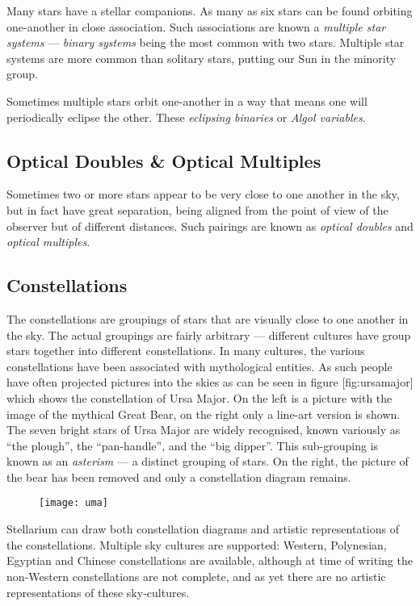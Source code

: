 Many stars have a stellar companions. As many as six stars can be found
orbiting one-another in close association. Such associations are known a
\emph{multiple star systems} --- \emph{binary systems} being the most
common with two stars. Multiple star systems are more common than
solitary stars, putting our Sun in the minority group.

Sometimes multiple stars orbit one-another in a way that means one will
periodically eclipse the other. These \emph{eclipsing binaries} or
\emph{Algol variables}.

\subsection{Optical Doubles \& Optical Multiples}\label{optical-doubles-optical-multiples}

Sometimes two or more stars appear to be very close to one another in
the sky, but in fact have great separation, being aligned from the point
of view of the observer but of different distances. Such pairings are
known as \emph{optical doubles} and \emph{optical multiples}.

\subsection{Constellations}\label{constellations}

The constellations are groupings of stars that are visually close to one
another in the sky. The actual groupings are fairly arbitrary ---
different cultures have group stars together into different
constellations. In many cultures, the various constellations have been
associated with mythological entities. As such people have often
projected pictures into the skies as can be seen in figure
{[}fig:ursamajor{]} which shows the constellation of Ursa Major. On the
left is a picture with the image of the mythical Great Bear, on the
right only a line-art version is shown. The seven bright stars of Ursa
Major are widely recognised, known variously as ``the plough'', the
``pan-handle'', and the ``big dipper''. This sub-grouping is known as an
\emph{asterism} --- a distinct grouping of stars. On the right, the
picture of the bear has been removed and only a constellation diagram
remains.

\begin{figure}[h]
\centering\texttt{[image: uma]}
\end{figure}

Stellarium can draw both constellation diagrams and artistic
representations of the constellations. Multiple sky cultures are
supported: Western, Polynesian, Egyptian and Chinese constellations are
available, although at time of writing the non-Western constellations
are not complete, and as yet there are no artistic representations of
these sky-cultures.

